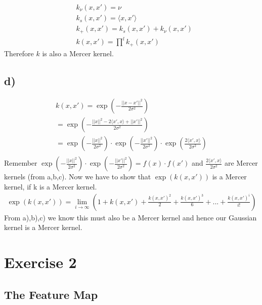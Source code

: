 \documentclass{article}
\begin{document}
\begin{align}
    & k_\nu(x, x') = \nu \\
    & k_s(x, x') = \langle{}x, x'\rangle{} \\
    & k_+(x, x') = k_s(x, x') + k_\nu(x, x') \\
    & k(x, x') = \prod^l k_+(x, x')
\end{align}
Therefore $k$ is also a Mercer kernel.


\subsection*{d)}
\begin{gather*}
k(x,x') = \exp{}(- \frac{||x-x'||^2}{2\sigma^2}) \\
= \exp{}(-\frac{||x||^2 - 2\langle{}x',x\rangle{} + ||x'||^2}{2\sigma^2}) \\
= \exp{}(-\frac{||x||^2}{2\sigma^2}) \cdot \exp{}(-\frac{||x'||^2}{2\sigma^2}) \cdot \exp{}(\frac{2\langle{}x',x\rangle{}}{2\sigma^2}) \\ 
\end{gather*}
Remember $\exp{}(-\frac{||x||^2}{2\sigma^2}) \cdot \exp{}(-\frac{||x'||^2}{2\sigma^2}) = f(x)\cdot f(x')$ and $\frac{2\langle{}x',x\rangle{}}{2\sigma^2}$ are Mercer kernels (from a,b,c). Now we have to show that $\exp{}(k(x,x'))$ is a Mercer kernel, if k is a Mercer kernel.
\begin{gather*}
\exp{}(k(x,x')) = \lim\limits_{i \rightarrow \infty}{(1 + k(x,x') + \frac{k(x,x')^2}{2} + \frac{k(x,x')^3}{6} + ... + \frac{k(x,x')^i}{i!})}
\end{gather*}
From a),b),c) we know this must also be a Mercer kernel and hence our Gaussian kernel is a Mercer kernel. 



\section*{Exercise 2}

\subsection*{The Feature Map}
\end{document}
